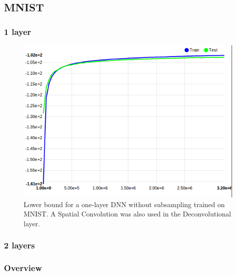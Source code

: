 \subsection{MNIST}

\subsubsection{1 layer}


\begin{figure}
	\includegraphics[scale=0.8,trim=0cm 0cm 0.1cm 0cm, clip=true]{images/MNIST_28_conv_nocuda.png}
	\caption{Lower bound for a one-layer DNN without subsampling trained on MNIST. A Spatial Convolution was also used in the Deconvolutional layer.}
	\label{label1}
\end{figure}

\subsubsection{2 layers}

\subsubsection{Overview}

